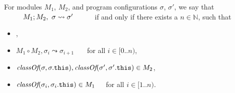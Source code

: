 \begin{definition}
\label{def:pair-reduce}
For  
  modules $M_1$,  $M_2$, and program configurations $\sigma$, $\sigma'$, 
we say that $\ \ \ \ \ \ \ \ \reduction{M_1}{M_2}{\sigma}{\sigma'}\ \ \ \ \ \ \ \ $ if and only if there exists a 
$n\in\mathbb{N}$, such that
\begin{itemize}
\item
{},
\item
$M_1 \circ M_2, \sigma_i \leadsto \sigma_{i+1}$  \ \ \ for all $i\in [0..n)$,
\item
$\textit{classOf}(\sigma, \sigma.{\texttt{this}}), \textit{classOf}(\sigma', \sigma'.{\texttt{this}})\in M_2$,
\item
$\textit{classOf}(\sigma_i, \sigma_i.{\texttt{this}}) \in M_1$\ \ \ for all $i\in [1..n)$.
\end{itemize} 
%
\end{definition}
